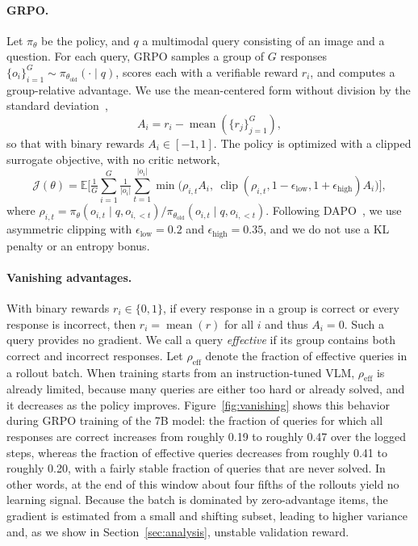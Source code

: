 \documentclass{article}
\begin{document}
\paragraph{GRPO.} Let $\pi_\theta$ be the policy, and $q$ a multimodal query consisting of an image and a question. For each query, GRPO samples a group of $G$ responses $\{o_i\}_{i=1}^{G}\sim\pi_{\theta_\text{old}}(\cdot\mid q)$, scores each with a verifiable reward $r_i$, and computes a group-relative advantage. We use the mean-centered form without division by the standard deviation~\citep{drgrpo},
\begin{equation}
A_i=r_i-\operatorname{mean}(\{r_j\}_{j=1}^G),
\end{equation}
so that with binary rewards $A_i\in[-1,1]$.
The policy is optimized with a clipped surrogate objective, with no critic network,
\begin{equation}
\mathcal{J}(\theta)=\mathbb{E}\Big[\tfrac{1}{G}\sum_{i=1}^G \tfrac{1}{|o_i|}\sum_{t=1}^{|o_i|}\min\big(\rho_{i,t}A_i,\ \operatorname{clip}(\rho_{i,t},1-\epsilon_\text{low},1+\epsilon_\text{high})A_i\big)\Big],
\end{equation}
where $\rho_{i,t}=\pi_\theta(o_{i,t}\mid q,o_{i,<t})/\pi_{\theta_\text{old}}(o_{i,t}\mid q,o_{i,<t})$. Following DAPO~\citep{dapo}, we use asymmetric clipping with $\epsilon_\text{low}=0.2$ and $\epsilon_\text{high}=0.35$, and we do not use a KL penalty or an entropy bonus.

\paragraph{Vanishing advantages.} With binary rewards $r_i\in\{0,1\}$, if every response in a group is correct or every response is incorrect, then $r_i=\operatorname{mean}(r)$ for all $i$ and thus $A_i=0$. Such a query provides no gradient. We call a query \emph{effective} if its group contains both correct and incorrect responses. Let $\rho_\text{eff}$ denote the fraction of effective queries in a rollout batch. When training starts from an instruction-tuned VLM, $\rho_\text{eff}$ is already limited, because many queries are either too hard or already solved, and it decreases as the policy improves. Figure~\ref{fig:vanishing} shows this behavior during GRPO training of the 7B model: the fraction of queries for which all responses are correct increases from roughly 0.19 to roughly 0.47 over the logged steps, whereas the fraction of effective queries decreases from roughly 0.41 to roughly 0.20, with a fairly stable fraction of queries that are never solved. In other words, at the end of this window about four fifths of the rollouts yield no learning signal. Because the batch is dominated by zero-advantage items, the gradient is estimated from a small and shifting subset, leading to higher variance and, as we show in Section~\ref{sec:analysis}, unstable validation reward.
\end{document}
